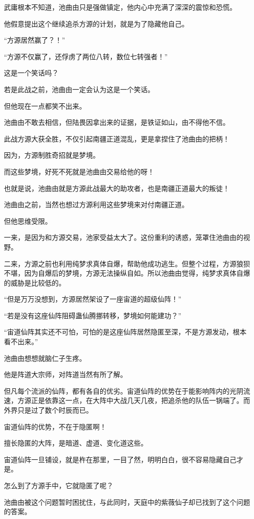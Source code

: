 \begin{this_body}
武庸根本不知道，池曲由只是强做镇定，他内心中充满了深深的震惊和恐慌。

他假意提出这个继续追杀方源的计划，就是为了隐藏他自己。

“方源居然赢了？！”

“方源不仅赢了，还俘虏了两位八转，数位七转强者！”

这是一个笑话吗？

若是此战之前，池曲由一定会认为这是一个笑话。

但他现在一点都笑不出来。

池曲由不敢去相信，但陆畏因拿出来的证据，是铁证如山，由不得他不信。

此战方源大获全胜，不仅引起南疆正道混乱，更是拿捏住了池曲由的把柄！

因为，方源制胜奇招就是梦境。

而这些梦境，好死不死就是池曲由交易给他的呀！

也就是说，池曲由就是方源此战最大的助攻者，也是南疆正道最大的叛徒！

池曲由之前，当然也想过方源利用这些梦境来对付南疆正道。

但他思维受限。

一来，是因为和方源交易，池家受益太大了。这份重利的诱惑，笼罩住池曲由的视野。

二来，方源之前也利用纯梦求真体自爆，帮助他成功逃生。但整个过程，方源狼狈不堪，因为自爆后的梦境，方源无法操纵自如。所以池曲由觉得，纯梦求真体自爆的威胁是比较低的。

“但是万万没想到，方源居然架设了一座宙道的超级仙阵！”

“若是没有这座仙阵阻碍蛊仙腾挪转移，梦境如何能建功？”

“宙道仙阵其实还不可怕，可怕的是这座仙阵居然隐匿至深，不是方源发动，根本看不出来。”

池曲由想想就脑仁子生疼。

他是阵道大宗师，对阵道当然有所了解。

但凡每个流派的仙阵，都有各自的优劣。宙道仙阵的优势在于能影响阵内的光阴流速，方源正是依靠这一点，在大阵中大战几天几夜，把追杀他的队伍一锅端了。而外界只是过了数个时辰而已。

宙道仙阵的优势，不在于隐匿啊！

擅长隐匿的大阵，是暗道、虚道、变化道这些。

宙道仙阵一旦铺设，就是杵在那里，一目了然，明明白白，很不容易隐藏自己才是。

怎么到了方源手中，它就隐匿了呢？

池曲由被这个问题暂时困扰住，与此同时，天庭中的紫薇仙子却已找到了这个问题的答案。


\end{this_body}
